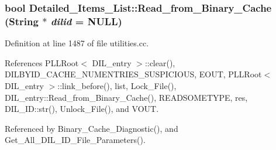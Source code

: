 \subsubsection{\setlength{\rightskip}{0pt plus 5cm}bool Detailed\_\-Items\_\-List::Read\_\-from\_\-Binary\_\-Cache ({\bf String} $\ast$ {\em dilid} = NULL)\hspace{0.3cm}{\tt  [protected]}}\label{classDetailed__Items__List_b1}




Definition at line 1487 of file utilities.cc.

References PLLRoot$<$ DIL\_\-entry $>$::clear(), DILBYID\_\-CACHE\_\-NUMENTRIES\_\-SUSPICIOUS, EOUT, PLLRoot$<$ DIL\_\-entry $>$::link\_\-before(), list, Lock\_\-File(), DIL\_\-entry::Read\_\-from\_\-Binary\_\-Cache(), READSOMETYPE, res, DIL\_\-ID::str(), Unlock\_\-File(), and VOUT.

Referenced by Binary\_\-Cache\_\-Diagnostic(), and Get\_\-All\_\-DIL\_\-ID\_\-File\_\-Parameters().



